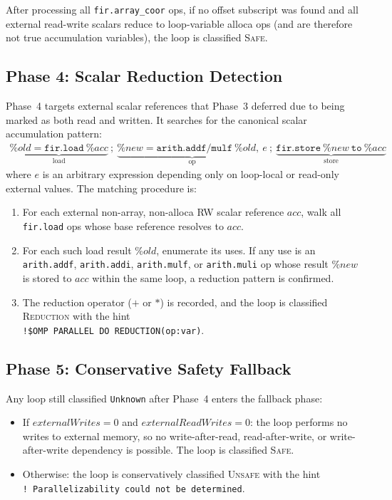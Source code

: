 \documentclass[conference]{IEEEtran}
\begin{document}
After processing all \texttt{fir.array\_coor} ops, if no offset
subscript was found and all external read-write scalars reduce to
loop-variable alloca ops (and are therefore not true accumulation
variables), the loop is classified \textsc{Safe}.

\subsection{Phase 4: Scalar Reduction Detection}

Phase~4 targets external scalar references that Phase~3 deferred due
to being marked as both read and written.  It searches for the
canonical scalar accumulation pattern:
\begin{align}
  \underbrace{\%\mathit{old} = \texttt{fir.load}\ \%\mathit{acc}}_{\text{load}}\ ;\ %
  \underbrace{\%\mathit{new} = \texttt{arith.addf/mulf}\ \%\mathit{old},\ e}_{\text{op}}\ ;\ %
  \underbrace{\texttt{fir.store}\ \%\mathit{new}\ \texttt{to}\ \%\mathit{acc}}_{\text{store}}
  \label{eq:reduction}
\end{align}
where $e$ is an arbitrary expression depending only on loop-local or
read-only external values.  The matching procedure is:
\begin{enumerate}
  \item For each external non-array, non-alloca RW scalar reference
        $\mathit{acc}$, walk all \texttt{fir.load} ops whose
        base reference resolves to $\mathit{acc}$.
  \item For each such load result $\%\mathit{old}$, enumerate its
        uses.  If any use is an \texttt{arith.addf}, \texttt{arith.addi},
        \texttt{arith.mulf}, or \texttt{arith.muli} op whose result
        $\%\mathit{new}$ is stored to $\mathit{acc}$ within the same
        loop, a reduction pattern is confirmed.
  \item The reduction operator ($+$ or $*$) is recorded, and the loop
        is classified \textsc{Reduction} with the hint\\
        \texttt{!\$OMP PARALLEL DO REDUCTION(op:var)}.
\end{enumerate}

\subsection{Phase 5: Conservative Safety Fallback}

Any loop still classified \texttt{Unknown} after Phase~4 enters the
fallback phase:
\begin{itemize}
  \item If $\mathit{externalWrites} = 0$ and
        $\mathit{externalReadWrites} = 0$: the loop performs no writes
        to external memory, so no write-after-read, read-after-write,
        or write-after-write dependency is possible.  The loop is
        classified \textsc{Safe}.
  \item Otherwise: the loop is conservatively classified
        \textsc{Unsafe} with the hint\\
        \texttt{! Parallelizability could not be determined}.
\end{itemize}
\end{document}
